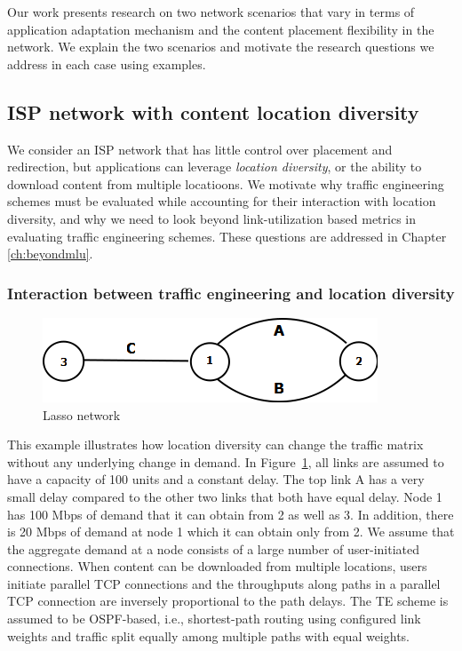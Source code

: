 Our work presents research on two network scenarios that vary in terms of application adaptation mechanism and the content placement flexibility in the network. We explain the two scenarios and motivate the research questions we address in each case using examples.

\subsection{ISP network with content location diversity}
\label{sec:bg-locdiv}
We consider an ISP network that has little control over placement and redirection, but applications can leverage \emph{location diversity}, or  the ability to download content from multiple locatioons. We motivate why traffic engineering schemes must be evaluated while accounting for their interaction with location diversity, and why we need to look beyond link-utilization based metrics in evaluating traffic engineering schemes. These questions are addressed in Chapter \ref{ch:beyondmlu}.

\subsubsection{Interaction between traffic engineering and location diversity}
\label{sec:bg-3node}

\begin{figure}[tbh]
	\centering
	\label{fig:3node-bg}\includegraphics[scale=0.5]{final_images/Diagram3node.png}
	\caption{Lasso network}
\end{figure}

This example illustrates how location diversity can change the traffic matrix without any underlying change in demand. In Figure~\ref{fig:3node-bg}, all links are assumed to have a capacity of 100 units and a constant delay. The top link A has a very small delay compared to the other two links that both have equal delay. Node 1 has 100 Mbps of demand that it can obtain from 2 as well as 3. In addition, there is 20 Mbps of demand at node 1 which it can obtain only from 2.  We assume that the aggregate demand at a node consists of a large number of user-initiated connections. When content can be downloaded from multiple locations, users initiate parallel TCP connections and the throughputs along paths in a parallel TCP connection are inversely proportional to the path delays. The TE scheme is assumed to be OSPF-based, i.e., shortest-path routing using configured link weights and traffic split equally among multiple paths with equal weights.

